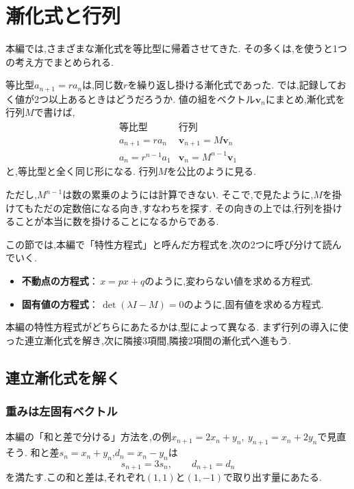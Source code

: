 
\section{漸化式と行列}\label{節：漸化式と行列}

本編では,さまざまな漸化式を等比型に帰着させてきた.
その多くは,を使うと1つの考え方でまとめられる.

等比型$a_{n+1}=ra_n$は,同じ数$r$を繰り返し掛ける漸化式であった.
では,記録しておく値が2つ以上あるときはどうだろうか.
値の組をベクトル$\boldsymbol v_n$にまとめ,漸化式を行列$M$で書けば,
\[
  \begin{array}{c|c}
    \text{等比型}&\text{行列}\\ \hline
    a_{n+1}=ra_n&\boldsymbol v_{n+1}=M\boldsymbol v_n\\
    a_n=r^{n-1}a_1&\boldsymbol v_n=M^{n-1}\boldsymbol v_1
  \end{array}
\]
と,等比型と全く同じ形になる.
行列$M$を公比のように見る.

ただし,$M^{n-1}$は数の累乗のようには計算できない.
そこで,で見たように,$M$を掛けてもただの定数倍になる向き,すなわちを探す.
その向きの上では,行列を掛けることが本当に数を掛けることになるからである.

この節では,本編で「特性方程式」と呼んだ方程式を,次の2つに呼び分けて読んでいく.
\begin{itemize}
  \item \textbf{不動点の方程式}：\,$x=px+q$のように,変わらない値を求める方程式.
  \item \textbf{固有値の方程式}：\,$\det(\lambda I-M)=0$のように,固有値を求める方程式.
\end{itemize}
本編の特性方程式がどちらにあたるかは,型によって異なる.
まず行列の導入に使った連立漸化式を解き,次に隣接3項間,隣接2項間の漸化式へ進もう.

\subsection{連立漸化式を解く}\label{節：連立漸化式を解く}

\subsubsection{重みは左固有ベクトル}
本編の「和と差で分ける」方法を,の例$x_{n+1}=2x_n+y_n,\ y_{n+1}=x_n+2y_n$で見直そう.
和と差$s_n=x_n+y_n$,$d_n=x_n-y_n$は
\[
  s_{n+1}=3s_n,\qquad d_{n+1}=d_n
\]
を満たす.この和と差は,それぞれ$(1,1)$と$(1,-1)$で取り出す量にあたる.

